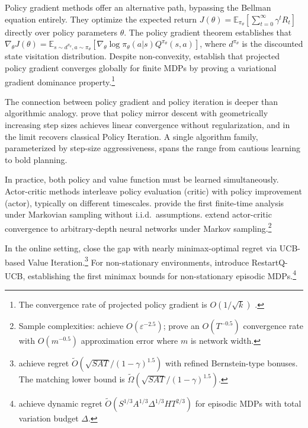 Policy gradient methods offer an alternative path, bypassing the Bellman equation entirely. They optimize the expected return $J(\theta) = \mathbb{E}_{\pi_\theta}[\sum_{t=0}^\infty \gamma^t R_t]$ directly over policy parameters $\theta$. The policy gradient theorem \citep{SuttonMcAllester2000} establishes that $\nabla_\theta J(\theta) = \mathbb{E}_{s \sim d^{\pi_\theta}, a \sim \pi_\theta} [\nabla_\theta \log \pi_\theta(a|s) Q^{\pi_\theta}(s,a)]$, where $d^{\pi_\theta}$ is the discounted state visitation distribution. Despite non-convexity, \citet{agarwal2021theory} establish that projected policy gradient converges globally for finite MDPs by proving a variational gradient dominance property.\footnote{The convergence rate of projected policy gradient is $O(1/\sqrt{k})$ \citep{agarwal2021theory}.}

The connection between policy gradient and policy iteration is deeper than algorithmic analogy. \citet{xiao2022convergence} prove that policy mirror descent with geometrically increasing step sizes achieves linear convergence without regularization, and in the limit recovers classical Policy Iteration. A single algorithm family, parameterized by step-size aggressiveness, spans the range from cautious learning to bold planning.

In practice, both policy and value function must be learned simultaneously. Actor-critic methods interleave policy evaluation (critic) with policy improvement (actor), typically on different timescales. \citet{wu2020twotimescale} provide the first finite-time analysis under Markovian sampling without i.i.d.\ assumptions. \citet{tian2023} extend actor-critic convergence to arbitrary-depth neural networks under Markov sampling.\footnote{Sample complexities: \citet{wu2020twotimescale} achieve $O(\varepsilon^{-2.5})$; \citet{tian2023} prove an $O(T^{-0.5})$ convergence rate with $O(m^{-0.5})$ approximation error where $m$ is network width.}

In the online setting, \citet{he2021nearly} close the gap with nearly minimax-optimal regret via UCB-based Value Iteration.\footnote{\citet{he2021nearly} achieve regret $\tilde{O}(\sqrt{SAT}/(1-\gamma)^{1.5})$ with refined Bernstein-type bonuses. The matching lower bound is $\tilde{\Omega}(\sqrt{SAT}/(1-\gamma)^{1.5})$.} For non-stationary environments, \citet{mao2021nonstationary} introduce RestartQ-UCB, establishing the first minimax bounds for non-stationary episodic MDPs.\footnote{\citet{mao2021nonstationary} achieve dynamic regret $\tilde{O}(S^{1/3}A^{1/3}\Delta^{1/3}HT^{2/3})$ for episodic MDPs with total variation budget $\Delta$.}

